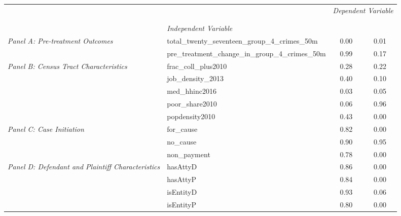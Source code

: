 \begin{tabular}{llcc}
\toprule
 &  & \multicolumn{2}{c}{\textit{Dependent Variable}} \\
\cline{3-4}
\\
 &  &  &  \\
 & \emph{Independent Variable} &  &  \\
\midrule
\multirow[c]{2}{3cm}{\textit{Panel A: Pre-treatment Outcomes}} & total_twenty_seventeen_group_4_crimes_50m & 0.00 & 0.01 \\
 & pre_treatment_change_in_group_4_crimes_50m & 0.99 & 0.17 \\
\cline{1-4}
\multirow[c]{5}{3cm}{\textit{Panel B: Census Tract Characteristics}} & frac_coll_plus2010 & 0.28 & 0.22 \\
 & job_density_2013 & 0.40 & 0.10 \\
 & med_hhinc2016 & 0.03 & 0.05 \\
 & poor_share2010 & 0.06 & 0.96 \\
 & popdensity2010 & 0.43 & 0.00 \\
\cline{1-4}
\multirow[c]{3}{3cm}{\textit{Panel C: Case Initiation}} & for_cause & 0.82 & 0.00 \\
 & no_cause & 0.90 & 0.95 \\
 & non_payment & 0.78 & 0.00 \\
\cline{1-4}
\multirow[c]{4}{3cm}{\textit{Panel D: Defendant and Plaintiff Characteristics}} & hasAttyD & 0.86 & 0.00 \\
 & hasAttyP & 0.84 & 0.00 \\
 & isEntityD & 0.93 & 0.06 \\
 & isEntityP & 0.80 & 0.00 \\
\cline{1-4}
\bottomrule
\end{tabular}
